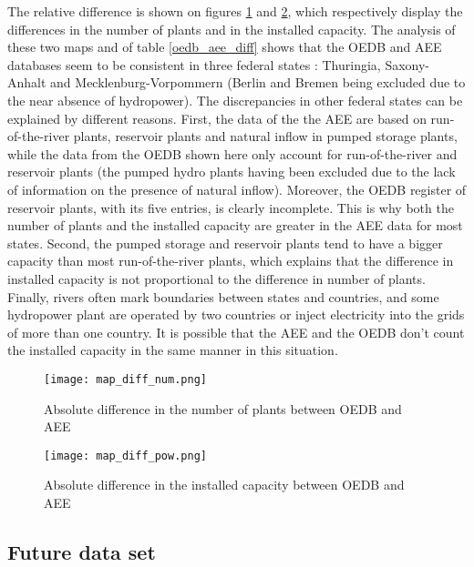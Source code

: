 The relative difference is shown on figures \ref{map_diff_num} and \ref{map_diff_pow}, which respectively display the differences in the number of plants and in the installed capacity. The analysis of these two maps and of table \ref{oedb_aee_diff} shows that the OEDB and AEE databases seem to be consistent in three federal states : Thuringia, Saxony-Anhalt and Mecklenburg-Vorpommern (Berlin and Bremen being excluded due to the near absence of hydropower). The discrepancies in other federal states can be explained by different reasons. First, the data of the the AEE are based on run-of-the-river plants, reservoir plants and natural inflow in pumped storage plants, while the data from the OEDB shown here only account for run-of-the-river and reservoir plants (the pumped hydro plants having been excluded due to the lack of information on the presence of natural inflow). Moreover, the OEDB register of reservoir plants, with its five entries, is clearly incomplete. This is why both the number of plants and the installed capacity are greater in the AEE data for most states. Second, the pumped storage and reservoir plants tend to have a bigger capacity than most run-of-the-river plants, which explains that the difference in installed capacity is not proportional to the difference in number of plants. Finally, rivers often mark boundaries between states and countries, and some hydropower plant are operated by two countries or inject electricity into the grids of more than one country. It is possible that the AEE and the OEDB don't count the installed capacity in the same manner in this situation.


\begin{figure}[H]
\centering
\texttt{[image: map\_diff\_num.png]}
\caption[Absolute difference in the number of plants between OEDB and AEE]{Absolute difference in the number of plants between OEDB and AEE}
\label{map_diff_num}
\end{figure}


\begin{figure}[H]
\centering
\texttt{[image: map\_diff\_pow.png]}
\caption[Absolute difference in the installed capacity between OEDB and AEE]{Absolute difference in the installed capacity between OEDB and AEE}
\label{map_diff_pow}
\end{figure}


\subsection{Future data set}

